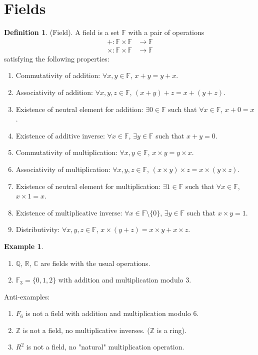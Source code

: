 \documentclass[10pt]{article}
\newcommand{\Z}{\mathbb{Z}}
\newcommand{\R}{\mathbb{R}}
\newcommand{\C}{\mathbb{C}}
\newcommand{\F}{\mathbb{F}}
\newcommand{\Q}{\mathbb{Q}}
\theoremstyle{definition}
\newtheorem{definition}[theorem]{Definition}
\newtheorem{example}[theorem]{Example}
\theoremstyle{remark}
\begin{document}
\newpage

\section{Fields}

\begin{definition}
    (Field).
    A field is a set $\F$ with a pair of operations
    \begin{align*}
        +: \F \times \F &\to \F \\
        \times: \F \times \F &\to \F
    \end{align*}
    satisfying the following properties:
    \begin{enumerate}
        \item Commutativity of addition: $\forall x, y \in \F$, $x + y = y + x$.
        \item Associativity of addition: $\forall x, y, z \in \F$, $(x + y) + z = x + (y + z)$.
        \item Existence of neutral element for addition: $\exists 0 \in \F$ such that $\forall x \in \F$, $x + 0 = x$.
        \item Existence of additive inverse: $\forall x \in \F$, $\exists y \in \F$ such that $x + y = 0$.
        \item Commutativity of multiplication: $\forall x, y \in \F$, $x \times y = y \times x$.
        \item Associativity of multiplication: $\forall x, y, z \in \F$, $(x \times y) \times z = x \times (y \times z)$.
        \item Existence of neutral element for multiplication: $\exists 1 \in \F$ such that $\forall x \in \F$, $x \times 1 = x$.
        \item Existence of multiplicative inverse: $\forall x \in \F \setminus \{0\}$, $\exists y \in \F$ such that $x \times y = 1$.
        \item Distributivity: $\forall x, y, z \in \F$, $x \times (y + z) = x \times y + x \times z$.
    \end{enumerate}
\end{definition}

\begin{example}
    \hfill
    \begin{enumerate}
        \item $\Q$, $\R$, $\C$ are fields with the usual operations.
        \item $\F_3 = \{0, 1, 2\}$ with addition and multiplication modulo 3.
    \end{enumerate}
    Anti-examples:
    \begin{enumerate}
        \item $F_6$ is not a field with addition and multiplication modulo 6.
        \item $\Z$ is not a field, no multiplicative inverses. ($\Z$ is a ring).
        \item $R^2$ is not a field, no "natural" multiplication operation.
    \end{enumerate}
\end{example}
\end{document}
